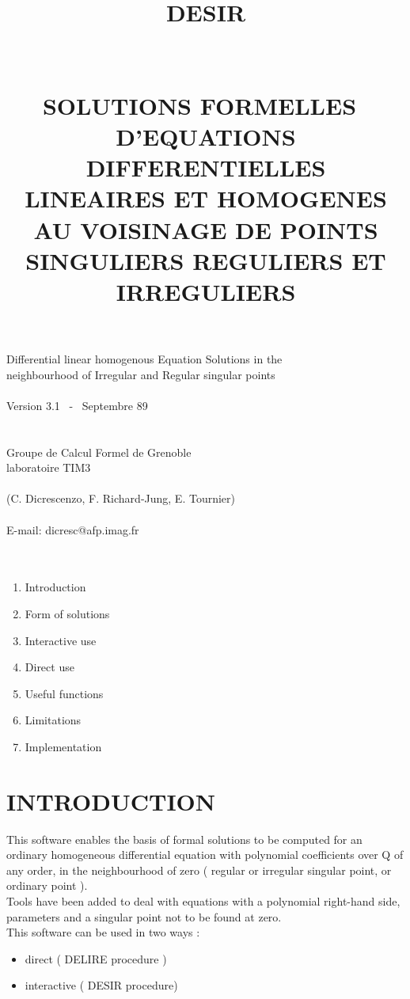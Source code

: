 \documentclass[a4paper]{article}
\title{{\bf DESIR} \\
\ \\
\ \\
SOLUTIONS FORMELLES~ D'EQUATIONS DIFFERENTIELLES \\
LINEAIRES ET HOMOGENES \\
AU VOISINAGE DE POINTS SINGULIERS REGULIERS ET IRREGULIERS \\
}
\begin{document}
\maketitle

\begin{center}
Differential linear homogenous Equation Solutions in the \\
neighbourhood of Irregular and Regular singular points \\
\ \\
Version 3.1~ -~ Septembre 89 \\
\ \\
\ \\
Groupe de Calcul Formel de Grenoble \\
laboratoire TIM3 \\
\ \\
(C. Dicrescenzo, F. Richard-Jung, E. Tournier) \\
\ \\
E-mail: dicresc@afp.imag.fr \\
\ \\
\ \\
\end{center}

\begin{enumerate}
\item Introduction
\item Form of solutions
\item Interactive use
\item Direct use
\item Useful functions
\item Limitations
\item Implementation
\end{enumerate}

\section{INTRODUCTION}

This software enables the basis of formal solutions to be computed for an
ordinary homogeneous differential equation with polynomial coefficients
over Q of any order, in the neighbourhood of zero ( regular or irregular
singular point, or ordinary point ). \\
Tools have been added to deal with equations with a polynomial right-hand
side, parameters and a singular point not to be found at zero. \\

This software can be used in two ways : 
\begin{itemize}
\item direct ( DELIRE procedure )
\item interactive ( DESIR procedure)
\end{itemize}
\end{document}
